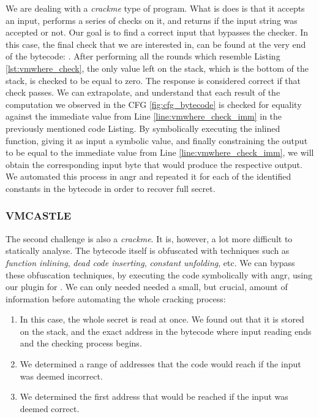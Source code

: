 We are dealing with a \emph{crackme} type of program. What is does is that it accepts an input, performs a series of checks on it, and returns if the input string was accepted or not. Our goal is to find a correct input that bypasses the checker. In this case, the final check that we are interested in, can be found at the very end of the bytecode: . After performing all the rounds which resemble Listing \ref{lst:vmwhere_check}, the only value left on the stack, which is the bottom of the stack, is checked to be equal to zero. The response is considered correct if that check passes. We can extrapolate, and understand that each result of the computation we observed in the \gls{CFG} \ref{fig:cfg_bytecode} is checked for equality against the immediate value from Line \ref{line:vmwhere_check_imm} in the previously mentioned code Listing. By symbolically executing the inlined function, giving it as input a symbolic value, and finally constraining the output to be equal to the immediate value \cc{\xZZ} from Line \ref{line:vmwhere_check_imm}, we will obtain the corresponding input byte that would produce the respective output. We automated this process in angr and repeated it for each of the identified constants in the bytecode in order to recover full secret. %

\subsubsection{VMCASTLE}

The second challenge is also a \emph{crackme}. It is, however, a lot more difficult to statically analyse. The bytecode itself is obfuscated with techniques such as \emph{function inlining}, \emph{dead code inserting}, \emph{constant unfolding}, etc. We can bypass these obfuscation techniques, by executing the code symbolically with angr, using our plugin for . We can only needed needed a small, but crucial, amount of information before automating the whole cracking process:

\begin{enumerate}
    \item In this case, the whole secret is read at once. We found out that it is stored on the stack, and the exact address in the bytecode where input reading ends and the checking process begins. \label{item:one}
    \item We determined a range of addresses that the code would reach if the input was deemed incorrect. \label{item:two}
    \item We determined the first address that would be reached if the input was deemed correct. \label{item:three}
\end{enumerate}

